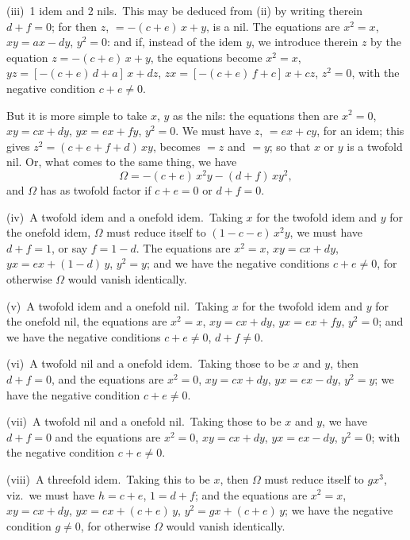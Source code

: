 \documentclass[11pt,a4paper]{article}
\begin{document}
\thispagestyle{plain}
\noindent (iii)\ 1 idem and 2 nils.\ This may be deduced from (ii) by writing therein $d + f = 0$; for then $z$, $= -(c + e)\,x + y$, is a nil.  The equations are $x^{2} = x$, $xy = ax - dy$, $y^{2} = 0$: and if, instead of the idem $y$, we introduce therein $z$ by the equation $z = -(c + e)\,x + y$, the equations become $x^{2} = x$, $yz = [-(c + e)\,d + a]\,x + dz$, $zx = [-(c + e)\,f + c]\,x + cz$, $z^{2} = 0$, with the negative condition $c + e \neq 0$.

\medskip
But it is more simple to take $x$, $y$ as the nils: the equations then are $x^{2} = 0$, $xy = cx + dy$, $yx = ex + fy$, $y^{2} = 0$.  We must have $z$, $= ex + cy$, for an idem; this gives $z^{2} = (c + e + f + d)\,xy$, becomes $= z$ and $= y$; so that $x$ or $y$ is a twofold nil.  Or, what comes to the same thing, we have
\[
\Omega = -(c + e)\,x^{2}y - (d + f)\,xy^{2},
\]
and $\Omega$ has as twofold factor if $c + e = 0$ or $d + f = 0$.

\medskip
(iv)\ A twofold idem and a onefold idem.\ Taking $x$ for the twofold idem and $y$ for the onefold idem, $\Omega$ must reduce itself to $(1 - c - e)\,x^{2}y$, we must have $d + f = 1$, or say $f = 1 - d$.  The equations are $x^{2} = x$, $xy = cx + dy$, $yx = ex + (1 - d)\,y$, $y^{2} = y$; and we have the negative conditions $c + e \neq 0$, for otherwise $\Omega$ would vanish identically.

\medskip
(v)\ A twofold idem and a onefold nil.\ Taking $x$ for the twofold idem and $y$ for the onefold nil, the equations are $x^{2} = x$, $xy = cx + dy$, $yx = ex + fy$, $y^{2} = 0$; and we have the negative conditions $c + e \neq 0$, $d + f \neq 0$.

\medskip
(vi)\ A twofold nil and a onefold idem.\ Taking those to be $x$ and $y$, then $d + f = 0$, and the equations are $x^{2} = 0$, $xy = cx + dy$, $yx = ex - dy$, $y^{2} = y$; we have the negative condition $c + e \neq 0$.

\medskip
(vii)\ A twofold nil and a onefold nil.\ Taking those to be $x$ and $y$, we have $d + f = 0$ and the equations are $x^{2} = 0$, $xy = cx + dy$, $yx = ex - dy$, $y^{2} = 0$; with the negative condition $c + e \neq 0$.

\medskip
(viii)\ A threefold idem.\ Taking this to be $x$, then $\Omega$ must reduce itself to $gx^{3}$, viz.\ we must have $h = c + e$, $1 = d + f$; and the equations are $x^{2} = x$, $xy = cx + dy$, $yx = ex + (c + e)\,y$, $y^{2} = gx + (c + e)\,y$; we have the negative condition $g \neq 0$, for otherwise $\Omega$ would vanish identically.
\end{document}
